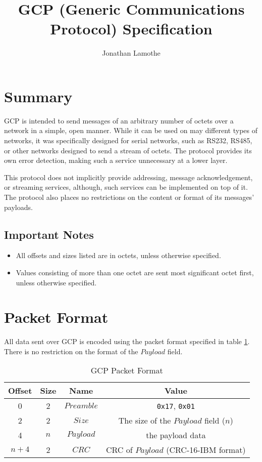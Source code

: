\documentclass{article}
\title{GCP (Generic Communications Protocol) Specification}
\author{Jonathan Lamothe}
\begin{document}
\maketitle

\section{Summary}
GCP is intended to send messages of an arbitrary number of octets over
a network in a simple, open manner.  While it can be used on may
different types of networks, it was specifically designed for serial
networks, such as RS232, RS485, or other networks designed to send a
stream of octets.  The protocol provides its own error detection,
making such a service unnecessary at a lower layer.

This protocol does not implicitly provide addressing, message
acknowledgement, or streaming services, although, such services can be
implemented on top of it.  The protocol also places no restrictions on
the content or format of its messages' payloads.

\subsection{Important Notes}
\begin{itemize}
\item All offsets and sizes listed are in octets, unless otherwise
  specified.
\item Values consisting of more than one octet are sent most
  significant octet first, unless otherwise specified.
\end{itemize}

\section{Packet Format}
All data sent over GCP is encoded using the packet format specified in
table \ref{tab:gen-pkt-fmt}.  There is no restriction on the format of
the $Payload$ field.

\begin{table}[hbp]
  \center
  \begin{tabular}{cccc}
    \textbf{Offset} & \textbf{Size} & \textbf{Name} & \textbf{Value}\\
    \hline
    0 & 2 & $Preamble$ & \texttt{0x17}, \texttt{0x01}\\
    2 & 2 & $Size$ & The size of the $Payload$ field ($n$)\\
    4 & $n$ & $Payload$ & the payload data\\
    $n + 4$ & 2 & $CRC$ & CRC of $Payload$ (CRC-16-IBM format)\\
    \hline
  \end{tabular}
  \caption{GCP Packet Format\label{tab:gen-pkt-fmt}}
\end{table}
\end{document}
